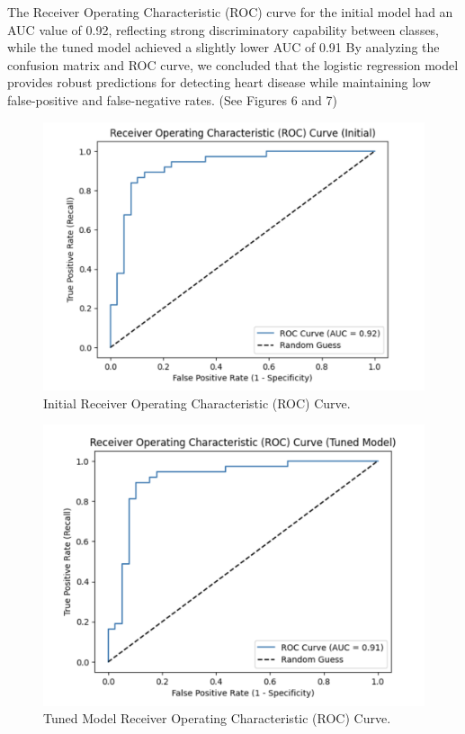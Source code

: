 The Receiver Operating Characteristic (ROC) curve for the initial model had an AUC value of 0.92, reflecting strong discriminatory capability between classes, while the tuned model achieved a slightly lower AUC of 0.91
By analyzing the confusion matrix and ROC curve, we concluded that the logistic regression model provides robust predictions for detecting heart disease while maintaining low false-positive and false-negative rates. (See Figures 6 and 7)

\begin{figure}[htbp]
    \centerline{\includegraphics[scale=0.2]{img/Receiver Operating Characteristic Curve Inital.png}}
    \caption{Initial Receiver Operating Characteristic (ROC) Curve.}\label{agedist}
\end{figure}

\begin{figure}[htbp]
    \centerline{\includegraphics[scale=0.2]{img/Receiver Operating Characteristic Curve Tuned Model.png}}
    \caption{Tuned Model Receiver Operating Characteristic (ROC) Curve.}\label{agedist}
\end{figure}

